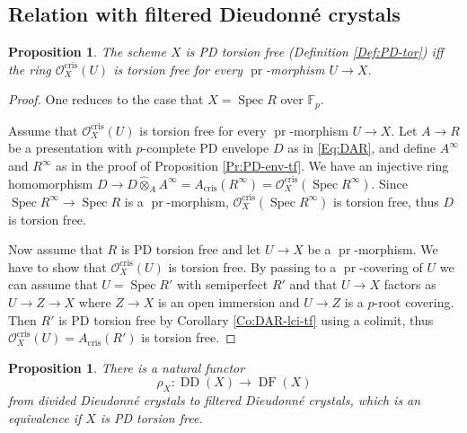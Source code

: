\documentclass[a4paper,11pt]{article}
\theoremstyle{plain}
\newtheorem{Prop}[Lemma]{Proposition}
\theoremstyle{definition}
\theoremstyle{remark}
\theoremstyle{definition}
\numberwithin{Lemma}{section}
\numberwithin{Subpoint}{Lemma}
\numberwithin{equation}{section}
\newcommand{\OOO}{\mathcal{O}}
\newcommand{\FF}{{\mathbb{F}}}
\DeclareMathOperator{\DDcat}{DD}
\DeclareMathOperator{\DFcat}{DF}
\DeclareMathOperator{\Spec}{Spec}
\newcommand{\hatotimes}{\mathbin{\hat\otimes}}
\DeclareMathOperator{\cris}{cris}
\newcommand{\nameoftop}{{\operatorname{pr}}}
\newcommand{\chang}[1]{{#1}}
\begin{document}
\subsection*{Relation with filtered Dieudonn\'e crystals}

\begin{Prop}
\label{Pr:tfD-tfO}
The scheme $X$
is PD torsion free
(Definition \ref{Def:PD-tor})
iff the ring\/ $\OOO_X^{\cris}(U)$ is torsion free for every
$\nameoftop$-morphism $U\to X$.
\end{Prop}

\begin{proof}
One reduces to the case that $X=\Spec R$ over $\FF_p$.

Assume that $\OOO_X^{\cris}(U)$ is torsion free for every 
$\nameoftop$-morphism $U\to X$.
Let $A\to R$ be a presentation with \chang{$p$-complete} PD envelope $D$ as in \eqref{Eq:DAR},
and define $A^\infty$ and $R^\infty$ 
as in the proof of Proposition \ref{Pr:PD-env-tf}.
We have an injective ring homomorphism
$D\to D\hatotimes_AA^\infty= A_{\cris}(R^\infty)=\OOO_X^{\cris}(\Spec R^\infty)$.
Since $\Spec R^\infty\to\Spec R$ is a $\nameoftop$-morphism,
$\OOO_X^{\cris}(\Spec R^\infty)$ is torsion free, thus $D$ is torsion free.

Now assume that $R$ is PD torsion free and let $U\to X$ be a $\nameoftop$-morphism. We have to show that $\OOO_X^{\cris}(U)$ is torsion free.
By passing to a $\nameoftop$-covering of $U$ we can assume that $U=\Spec R'$
with semiperfect $R'$ and that $U\to X$ factors as $U\to Z\to X$ 
where $Z\to X$ is an open immersion and $U\to Z$ is a $p$-root covering.
Then $R'$ is PD torsion free by Corollary \ref{Co:DAR-lci-tf} 
using a colimit, thus $\OOO_X^{\cris}(U)=A_{\cris}(R')$ is torsion free.
\end{proof}

\begin{Prop}
\label{Pr:tf-DD-DF}
There is a natural functor
\begin{equation*}
\rho_X:\DDcat(X)\to\DFcat(X)
\end{equation*}
from divided Dieudonn\'e crystals to filtered Dieudonn\'e crystals,
which is an equivalence if $X$
is PD torsion free.
\end{Prop}
\end{document}
